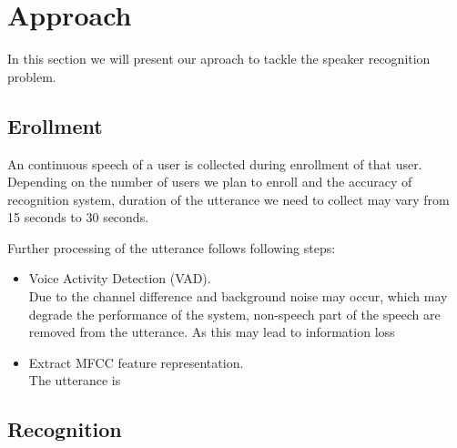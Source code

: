 \section{Approach}
	In this section we will present our aproach to tackle the speaker recognition problem.
\subsection{Erollment}
	An continuous speech of a user is collected during enrollment of that user. Depending on
	the number of users we plan to enroll and the accuracy of recognition system, duration
	of the utterance we need to collect may vary from 15 seconds to 30 seconds.

	Further processing of the utterance follows following steps:
	\begin{itemize}
		\item Voice Activity Detection (VAD). \\
			Due to the channel difference and background noise may occur, which may
			degrade the performance of the system, non-speech part of the speech are removed
			from the utterance. As this may lead to information loss %
		\item Extract MFCC feature representation. \\
			The utterance is
	\end{itemize}

\subsection{Recognition}
